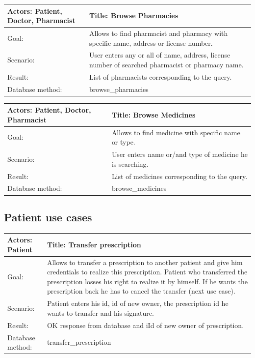 \begin{longtable}{|p{6cm}|p{7.75cm}|}
    
    \hline
    Actors: Patient, Doctor, Pharmacist &Title: Browse Pharmacies \\ \hline
    Goal: & Allows to find pharmacist and pharmacy with specific name, address or license number. \\ \hline
    Scenario: & User enters any or all of name, address, license number of searched pharmacist or pharmacy name. \\ \hline
    Result: & List of pharmacists corresponding to the query. \\ \hline
    Database  method: & browse\_pharmacies \\ \hline

\end{longtable}


    \begin{longtable}{| p{6cm} | p{7.75cm} |}
    \hline
    Actors: Patient, Doctor, Pharmacist &Title: Browse Medicines \\ \hline
    Goal: & Allows to find medicine with specific name or type. \\ \hline
    Scenario: & User enters name or/and type of medicine he is searching. \\ \hline
    Result: & List of medicines corresponding to the query. \\ \hline
    Database  method: & browse\_medicines \\ \hline
    \end{longtable}


\subsection{Patient use cases}


    \begin{longtable}{| p{6cm} | p{7.75cm} |}
    \hline
    Actors: Patient &Title: Transfer prescription \\ \hline
    Goal: & Allows to transfer a prescription to another patient and give him credentials to realize this prescription. Patient who transferred the prescription losses his right to realize it by himself. If he wants the prescription back he has to cancel the transfer (next use case). \\ \hline
    Scenario: & Patient enters his id, id of new owner, the prescription id he wants to transfer and his signature. \\ \hline
    Result: & OK response from database and iId of new owner of prescription. \\ \hline
    Database  method: & transfer\_prescription \\ \hline
\end{longtable}

